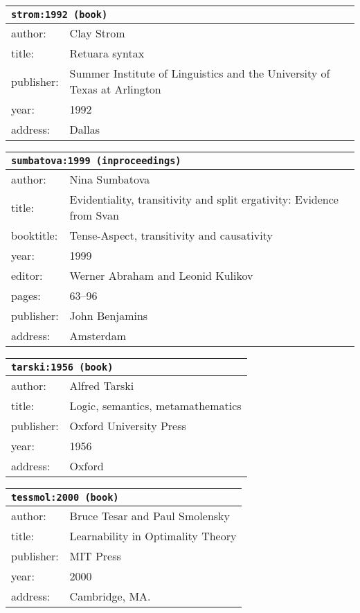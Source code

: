\documentclass{article}
\begin{document}
\bigskip

\begin{tabular}{p{}p{}}
\multicolumn{2}{l}{\texttt{strom:1992 (book)}}\\
\hline
author: & Clay Strom\\
title: & Retuara syntax\\
publisher: & Summer Institute of Linguistics and the University of Texas at Arlington\\
year: & 1992\\
address: & Dallas\\
\end{tabular}

\bigskip

\begin{tabular}{p{}p{}}
\multicolumn{2}{l}{\texttt{sumbatova:1999 (inproceedings)}}\\
\hline
author: & Nina Sumbatova\\
title: & Evidentiality, transitivity and split ergativity: Evidence from Svan\\
booktitle: & Tense-Aspect, transitivity and causativity\\
year: & 1999\\
editor: & Werner Abraham and Leonid Kulikov\\
pages: & 63--96\\
publisher: & John Benjamins\\
address: & Amsterdam\\
\end{tabular}

\bigskip

\begin{tabular}{p{}p{}}
\multicolumn{2}{l}{\texttt{tarski:1956 (book)}}\\
\hline
author: & Alfred Tarski\\
title: & Logic, semantics, metamathematics\\
publisher: & Oxford University Press\\
year: & 1956\\
address: & Oxford\\
\end{tabular}

\bigskip

\begin{tabular}{p{}p{}}
\multicolumn{2}{l}{\texttt{tessmol:2000 (book)}}\\
\hline
author: & Bruce Tesar and Paul Smolensky\\
title: & Learnability in Optimality Theory\\
publisher: & MIT Press\\
year: & 2000\\
address: & Cambridge, MA.\\
\end{tabular}
\end{document}
